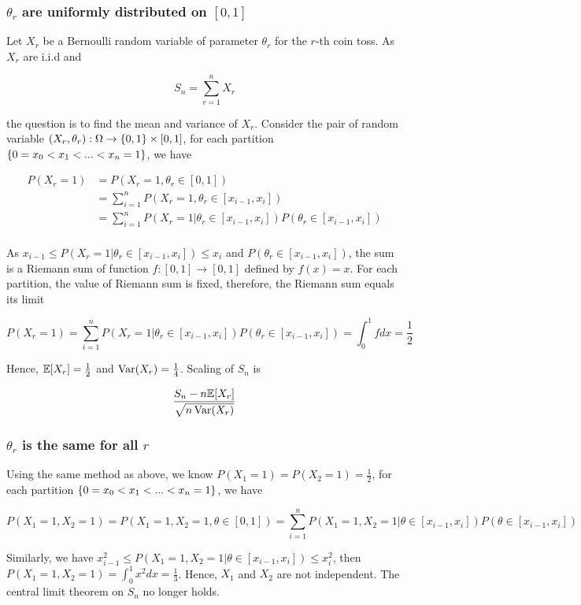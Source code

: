 \documentclass{article}
\begin{document}
\subsubsection{$\theta_r$ are uniformly distributed on $[0, 1]$}


Let $X_r$ be a Bernoulli random variable of parameter $\theta_r$ for the $r$-th coin toss. As $X_r$ are i.i.d and

$$
    S_n = \sum_{r = 1}^n X_r 
$$

the question is to find the mean and variance of $X_r$. Consider the pair of random variable $(X_r, \theta_r): \Omega \to \{0, 1\} \times [0, 1]$, for each partition $\{0 = x_0 < x_1 < ... < x_n = 1\}$, we have

\begin{align*}
    P(X_r = 1)
    &= P(X_r = 1, \theta_r \in [0, 1]) \\
    &= \sum_{i=1}^n P(X_r = 1, \theta_r \in [x_{i-1}, x_i]) \\
    &= \sum_{i=1}^n P(X_r = 1 | \theta_r \in [x_{i-1}, x_i]) P(\theta_r \in [x_{i-1}, x_i]) \\
\end{align*}

As $x_{i-1} \leq P(X_r = 1 | \theta_r \in [x_{i-1}, x_i]) \leq x_i$ and $P(\theta_r \in [x_{i-1}, x_i])$, the sum is a Riemann sum of function $f: [0, 1] \to [0, 1]$ defined by $f(x) = x$. For each partition, the value of Riemann sum is fixed, therefore, the Riemann sum equals its limit

$$
    P(X_r = 1) = \sum_{i=1}^n P(X_r = 1 | \theta_r \in [x_{i-1}, x_i]) P(\theta_r \in [x_{i-1}, x_i]) = \int_0^1 f dx = \frac{1}{2}
$$

Hence, $\mathbb{E}[X_r] = \frac{1}{2}$ and $\operatorname{Var}(X_r) = \frac{1}{4}$. Scaling of $S_n$ is

$$
    \frac{S_n - n\mathbb{E}[X_r]}{\sqrt{n \operatorname{Var}(X_r)}}
$$

\subsubsection{$\theta_r$ is the same for all $r$}

Using the same method as above, we know $P(X_1 = 1) = P(X_2 = 1) = \frac{1}{2}$, for each partition $\{0 = x_0 < x_1 < ... < x_n = 1\}$, we have

$$
    P(X_1=1, X_2=1) = P(X_1=1, X_2=1, \theta \in [0, 1]) = \sum_{i=1}^n P(X_1=1, X_2=1 | \theta \in [x_{i-1}, x_i]) P(\theta \in [x_{i-1}, x_i])
$$

Similarly, we have $x_{i-1}^2 \leq P(X_1=1, X_2=1 | \theta \in [x_{i-1}, x_i]) \leq x_i^2$, then $P(X_1=1, X_2=1) = \int_0^1 x^2 dx = \frac{1}{3}$. Hence, $X_1$ and $X_2$ are not independent. The central limit theorem on $S_n$ no longer holds.
\end{document}
